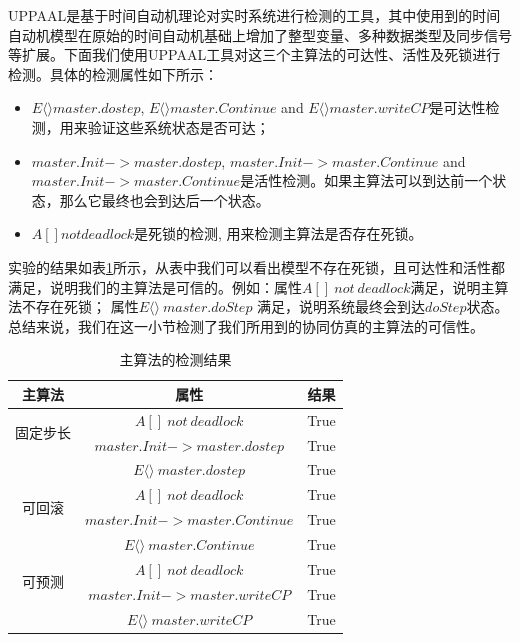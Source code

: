 UPPAAL是基于时间自动机理论对实时系统进行检测的工具，其中使用到的时间自动机模型在原始的时间自动机基础上增加了整型变量、多种数据类型及同步信号等扩展。下面我们使用UPPAAL工具对这三个主算法的可达性、活性及死锁进行检测。具体的检测属性如下所示：
\begin{itemize}
\item
$E \langle\rangle master.dostep$, $E\langle\rangle master.Continue$ and $E\langle\rangle master.writeCP$是可达性检测，用来验证这些系统状态是否可达；
\item
$master.Init -> master.dostep$, $master.Init -> master.Continue$ and $master.Init -> master.Continue$是活性检测。如果主算法可以到达前一个状态，那么它最终也会到达后一个状态。
\item
$A[] not deadlock$是死锁的检测, 用来检测主算法是否存在死锁。
\end{itemize}
实验的结果如表\ref{ta_r}所示，从表中我们可以看出模型不存在死锁，且可达性和活性都满足，说明我们的主算法是可信的。例如：属性$A[]~not~deadlock$满足，说明主算法不存在死锁； 属性$E\langle\rangle~master.doStep$ 满足，说明系统最终会到达$doStep$状态。 总结来说，我们在这一小节检测了我们所用到的协同仿真的主算法的可信性。
\begin{table}
\caption{主算法的检测结果}
\centering
\begin{tabular}{c c c}
          \hline
          主算法 & 属性 & 结果\\
       \hline
        \multirow{2}{2.0cm}{固定步长}
                & $A[]~not~deadlock$ & True\\
                & $master.Init -> master.dostep$ & True\\
                & $E\langle\rangle~master.dostep$ & True\\

        \hline
        \multirow{2}{2.0cm}{可回滚}
                & $A[]~not~deadlock$ & True\\
                & $master.Init -> master.Continue$ & True\\
                & $E\langle\rangle~master.Continue$ & True\\

        \hline
        \multirow{2}{2.0cm}{可预测}
                & $A[]~not~deadlock$ & True\\
                & $master.Init -> master.writeCP$ & True\\
                & $E\langle\rangle~master.writeCP$ & True\\
        \hline
\end{tabular}
\label{ta_r}
\end{table}

